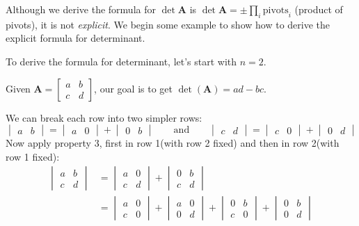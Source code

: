 Although we derive the formula for $\det\bm A$ is $\det\bm A=\pm\prod_i\text{pivots}_{i}$ (product of pivots), it is not \emph{explicit}. We begin some example to show how to derive the explicit formula for determinant.
\begin{example}
To derive the formula for determinant, let's start with $n=2$.

Given $\bm A=\begin{bmatrix}
a&b\\c&d
\end{bmatrix}$, our goal is to get $\det(\bm A) = ad-bc$.

We can break each row into two simpler rows:
\[
\begin{vmatrix}
a&b
\end{vmatrix}=\begin{vmatrix}
a&0
\end{vmatrix}+\begin{vmatrix}
0&b
\end{vmatrix}\qquad\text{and}\qquad
\begin{vmatrix}
c&d
\end{vmatrix}=\begin{vmatrix}
c&0
\end{vmatrix}+\begin{vmatrix}
0&d
\end{vmatrix}
\]
Now apply property 3, first in row 1(with row 2 fixed) and then in row 2(with row 1 fixed):
\[
\begin{aligned}
\begin{vmatrix}
a&b\\c&d
\end{vmatrix}&=\begin{vmatrix}
a&0\\c&d
\end{vmatrix}+\begin{vmatrix}
0&b\\c&d
\end{vmatrix}\\&=\begin{vmatrix}
a&0\\c&0
\end{vmatrix}+\begin{vmatrix}
a&0\\0&d
\end{vmatrix}+\begin{vmatrix}
0&b\\c&0
\end{vmatrix}+\begin{vmatrix}
0&b\\0&d

\end{vmatrix}
\end{aligned}\]
\end{example}
